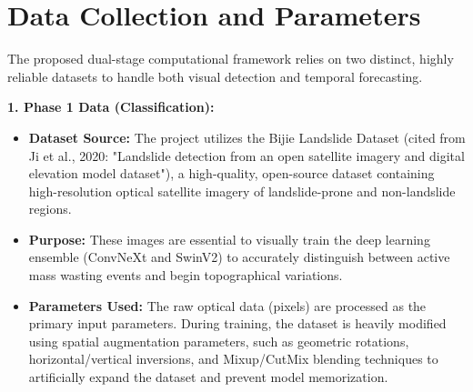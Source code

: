 \documentclass[11pt,a4paper]{article}
\begin{document}
\section{Data Collection and Parameters}
The proposed dual-stage computational framework relies on two distinct, highly reliable datasets to handle both visual detection and temporal forecasting.

\textbf{1. Phase 1 Data (Classification):}
\begin{itemize}
    \item \textbf{Dataset Source:} The project utilizes the Bijie Landslide Dataset (cited from Ji et al., 2020: "Landslide detection from an open satellite imagery and digital elevation model dataset"), a high-quality, open-source dataset containing high-resolution optical satellite imagery of landslide-prone and non-landslide regions.
    \item \textbf{Purpose:} These images are essential to visually train the deep learning ensemble (ConvNeXt and SwinV2) to accurately distinguish between active mass wasting events and begin topographical variations.
    \item \textbf{Parameters Used:} The raw optical data (pixels) are processed as the primary input parameters. During training, the dataset is heavily modified using spatial augmentation parameters, such as geometric rotations, horizontal/vertical inversions, and Mixup/CutMix blending techniques to artificially expand the dataset and prevent model memorization.
\end{itemize}
\end{document}

